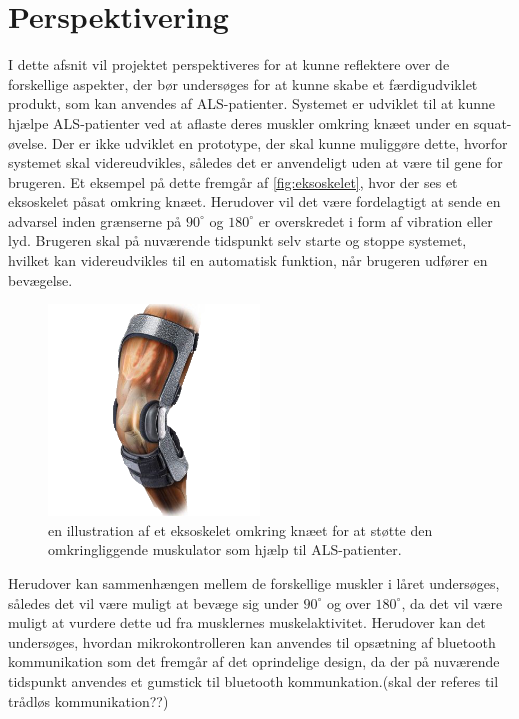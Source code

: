 \section{Perspektivering}
I dette afsnit vil projektet perspektiveres for at kunne reflektere over de forskellige aspekter, der bør undersøges for at kunne skabe et færdigudviklet produkt, som kan anvendes af ALS-patienter. Systemet er udviklet til at kunne hjælpe ALS-patienter ved at aflaste deres muskler omkring knæet under en squat-øvelse. Der er ikke udviklet en prototype, der skal kunne muliggøre dette, hvorfor systemet skal videreudvikles, således det er anvendeligt uden at være til gene for brugeren. Et eksempel på dette fremgår af \autoref{fig:eksoskelet}, hvor der ses et eksoskelet påsat omkring knæet. Herudover vil det være fordelagtigt at sende en advarsel inden grænserne på $90^{\circ}$ og $180^{\circ}$ er overskredet i form af vibration eller lyd. Brugeren skal på nuværende tidspunkt selv starte og stoppe systemet, hvilket kan videreudvikles til en automatisk funktion, når brugeren udfører en bevægelse. 

\begin{figure}[H]
\centering
\includegraphics[width=0.5\textwidth]{figures/eksoskelet}
\caption{en illustration af et eksoskelet omkring knæet for at støtte den omkringliggende muskulator som hjælp til ALS-patienter.}
\label{fig:eksoskelet}
\end{figure}

\noindent
Herudover kan sammenhængen mellem de forskellige muskler i låret undersøges, således det vil være muligt at bevæge sig under $90^{\circ}$ og over $180^{\circ}$, da det vil være muligt at vurdere dette ud fra musklernes muskelaktivitet. Herudover kan det undersøges, hvordan mikrokontrolleren kan anvendes til opsætning af bluetooth kommunikation som det fremgår af det oprindelige design, da der på nuværende tidspunkt anvendes et gumstick til bluetooth kommunkation.(skal der referes til trådløs kommunikation??)

